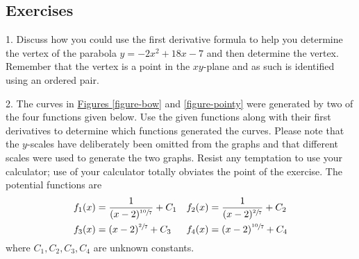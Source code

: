 \documentclass[12pt,]{book}
\theoremstyle{plain}
\theoremstyle{definition}
\numberwithin{equation}{section}
\newcounter{figstack}
\newlength\fight
\newcommand\pushValignCaptionBottom[5][b]{%
\stepcounter{figstack}%
\expandafter\def\csname %
figalign\romannumeral\value{figstack}\endcsname{#1}%
\expandafter\def\csname %
figtype\romannumeral\value{figstack}\endcsname{#2}%
\expandafter\def\csname %
figwd\romannumeral\value{figstack}\endcsname{#3}%
\expandafter\def\csname %
figcontent\romannumeral\value{figstack}\endcsname{#4}%
\expandafter\def\csname %
figcap\romannumeral\value{figstack}\endcsname{#5}%
\setbox0=\hbox{%
\begin{#2}{#3}#4\end{#2}}%
\ifdim\dimexpr\ht0+\dp0\relax>\fight\global\setlength{\fight}{%
\dimexpr\ht0+\dp0\relax}\fi%
}
\newcommand{\fe}[2]{#1\mathopen{}\left(#2\right)\mathclose{}}
\begin{document}
\subsection[Exercises]{Exercises}\label{exercises-55}
\begin{exerciselist}
\item[1.]\hypertarget{exercise-parabola-vertex}{\null}Discuss how you could use the first derivative formula to help you determine the vertex of the parabola \(y=-2x^2+18x-7\) and then determine the vertex.  Remember that the vertex is a point in the \(xy\)-plane and as such is identified using an ordered pair.%
\par\smallskip
\item[2.]\hypertarget{exercise-distinguish-graphs-by-critical-nature}{\null}The curves in \hyperref[figure-bow]{Figures \ref{figure-bow}} and \hyperref[figure-pointy]{\ref{figure-pointy}} were generated by two of the four functions given below.  Use the given functions along with their first derivatives to determine which functions generated the curves.  Please note that the \(y\)-scales have deliberately been omitted from the graphs and that different scales were used to generate the two graphs.  Resist any temptation to use your calculator; use of your calculator totally obviates the point of the exercise. The potential functions are \begin{align*}
\fe{f_1}{x}&=\frac{1}{(x-2)^{\sfrac{10}{7}}}+C_1&\fe{f_2}{x}&=\frac{1}{(x-2)^{\sfrac{2}{7}}}+C_2\\
\fe{f_3}{x}&=(x-2)^{\sfrac{2}{7}}+C_3&\fe{f_4}{x}&=(x-2)^{\sfrac{10}{7}}+C_4
\end{align*} where \(C_1,C_2,C_3,C_4\) are unknown constants.%
\end{exerciselist}
\end{document}
